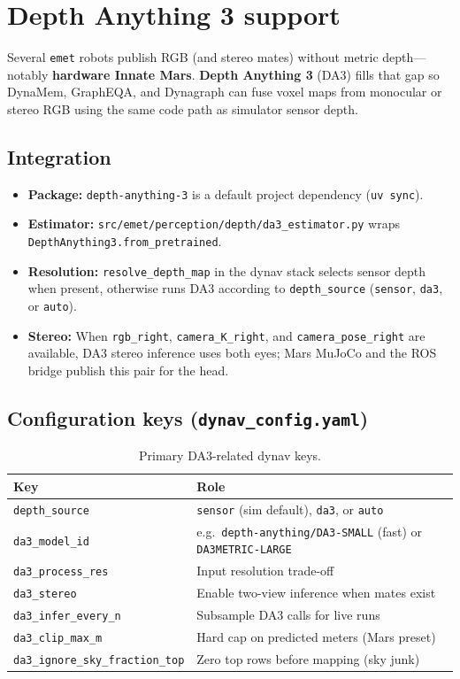 \section{Depth Anything 3 support}
\label{app:da3}

Several \texttt{emet} robots publish RGB (and stereo mates) without metric depth---notably \textbf{hardware Innate Mars}.
\textbf{Depth Anything 3} (DA3) fills that gap so DynaMem, GraphEQA, and Dynagraph can fuse voxel maps from monocular or stereo RGB using the same code path as simulator sensor depth.

\subsection{Integration}

\begin{itemize}
  \item \textbf{Package:} \texttt{depth-anything-3} is a default project dependency (\texttt{uv sync}).
  \item \textbf{Estimator:} \texttt{src/emet/perception/depth/da3\_estimator.py} wraps \texttt{DepthAnything3.from\_pretrained}.
  \item \textbf{Resolution:} \texttt{resolve\_depth\_map} in the dynav stack selects sensor depth when present, otherwise runs DA3 according to \texttt{depth\_source} (\texttt{sensor}, \texttt{da3}, or \texttt{auto}).
  \item \textbf{Stereo:} When \texttt{rgb\_right}, \texttt{camera\_K\_right}, and \texttt{camera\_pose\_right} are available, DA3 stereo inference uses both eyes; Mars MuJoCo and the ROS bridge publish this pair for the head.
\end{itemize}

\subsection{Configuration keys (\texttt{dynav\_config.yaml})}

\begin{table}[h]
  \centering
  \caption{Primary DA3-related dynav keys.}
  \label{tab:da3-keys}
  \small
  \begin{tabular}{@{}ll@{}}
    \toprule
    Key & Role \\
    \midrule
    \texttt{depth\_source} & \texttt{sensor} (sim default), \texttt{da3}, or \texttt{auto} \\
    \texttt{da3\_model\_id} & e.g.\ \texttt{depth-anything/DA3-SMALL} (fast) or \texttt{DA3METRIC-LARGE} \\
    \texttt{da3\_process\_res} & Input resolution trade-off \\
    \texttt{da3\_stereo} & Enable two-view inference when mates exist \\
    \texttt{da3\_infer\_every\_n} & Subsample DA3 calls for live runs \\
    \texttt{da3\_clip\_max\_m} & Hard cap on predicted meters (Mars preset) \\
    \texttt{da3\_ignore\_sky\_fraction\_top} & Zero top rows before mapping (sky junk) \\
    \bottomrule
  \end{tabular}
\end{table}

